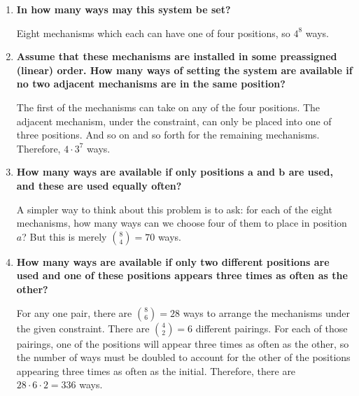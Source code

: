\documentclass[10pt, oneside]{article}   	%
\theoremstyle{definition}
\begin{document}
\begin{enumerate}[label=2.\arabic*]
  	\begin{enumerate}
	\item \begin{tcolorbox}[
  colback=Cerulean!5!white,
  colframe=Cerulean!75!black]
  \textbf{In how many ways may this system be set?}
  \end{tcolorbox}
  
  	Eight mechanisms which each can have one of four positions, so $\boxed{4^8}$ ways.
  	\item \begin{tcolorbox}[
  colback=Cerulean!5!white,
  colframe=Cerulean!75!black]
  \textbf{Assume that these mechanisms are installed in some preassigned (linear) order. How many ways of setting the system are available if no two adjacent mechanisms are in the same position?}
  \end{tcolorbox}
  
  	The first of the mechanisms can take on any of the four positions. The adjacent mechanism, under the constraint, can only be placed into one of three positions. And so on and so forth for the remaining mechanisms. Therefore, $\boxed{4 \cdot 3^7}$ ways.
  	\item \begin{tcolorbox}[
  colback=Cerulean!5!white,
  colframe=Cerulean!75!black]
  \textbf{How many ways are available if only positions $\bm{a}$ and $\bm{b}$ are used, and these are used equally often?}
  \end{tcolorbox}
  
  	A simpler way to think about this problem is to ask: for each of the eight mechanisms, how many ways can we choose four of them to place in position $a$? But this is merely $\binom{8}{4} = \boxed{70}$ ways.
  	\item \begin{tcolorbox}[
  colback=Cerulean!5!white,
  colframe=Cerulean!75!black]
  \textbf{How many ways are available if only two different positions are used and one of these positions appears three times as often as the other?}
  \end{tcolorbox}
  
  	For any one pair, there are $\binom{8}{6} = 28$ ways to arrange the mechanisms under the given constraint. There are $\binom{4}{2} = 6$ different pairings. For each of those pairings, one of the positions will appear three times as often as the other, so the number of ways must be doubled to account for the other of the positions appearing three times as often as the initial. Therefore, there are $28 \cdot 6 \cdot 2 = \boxed{336}$ ways.
	

\end{enumerate}
\end{enumerate}
\end{document}
